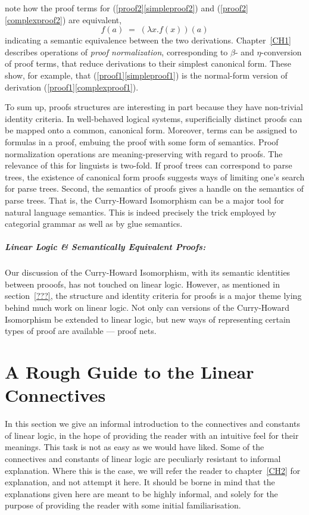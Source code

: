note how the proof terms for (\ref{proof2}\ref{simpleproof2}) and
(\ref{proof2}\ref{complexproof2}) are equivalent,
\[f(a) \; = \; (\lambda x.f(x))(a)\]
indicating a semantic equivalence between the two derivations.
Chapter~\ref{CH1} describes operations of {\it proof normalization},
corresponding to $\beta$- and 
$\eta$-conversion of proof terms, that reduce
derivations to their simplest canonical form.  These show, for
example, that (\ref{proof1}\ref{simpleproof1}) is the normal-form
version of derivation (\ref{proof1}\ref{complexproof1}).

To sum up, proofs structures are interesting in part because they have
non-trivial identity criteria.  In well-behaved logical systems, superificially
distinct proofs can be mapped onto a common, canonical form.  Moreover, 
terms can be assigned to formulas in a proof, embuing the proof with some
form of semantics.  Proof normalization operations are meaning-preserving
with regard to proofs.  The relevance of this for linguists is two-fold.
If proof trees can correspond to parse trees, the existence of canonical form
proofs suggests ways of limiting one's search for parse trees.  Second,
the semantics of proofs gives a handle on the semantics of parse trees.
That is, the Curry-Howard Isomorphism can be a major tool for natural language
semantics.  This is indeed precisely the trick employed by categorial grammar
as well as by glue semantics.

\subparagraph{Linear Logic \& Semantically Equivalent Proofs:}
Our discussion of the Curry-Howard Isomorphism, with its semantic 
identities between prooofs, has not touched on linear logic.
However, as mentioned in section~\ref{???}, the structure and
identity criteria for proofs is a major theme lying behind much work
on linear logic.  Not only can versions of the Curry-Howard
Isomorphism be extended to linear logic, but new ways of representing
certain types of proof are available --- proof nets.

\section{A Rough Guide to the Linear Connectives}

In this section we give an informal introduction to the connectives
and constants of linear logic, in the hope of providing the reader 
with an intuitive feel for their meanings.  This task is not as easy
as we would have liked.  Some of the connectives and constants of
linear logic are peculiarly resistant to informal explanation.
Where this is the case, we will refer the reader to
chapter~\ref{CH2} for explanation, and not attempt it here.
It should be borne in mind that the explanations given here are
meant to be highly informal, and solely for the purpose of providing
the reader with some initial familiarisation.  

